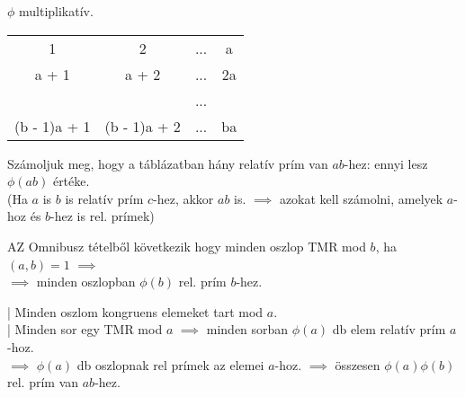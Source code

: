 \begin{frame}
  \begin{tcolorbox}[title={Tétel: $\phi$ multiplikativitása}]
  $\phi$ multiplikatív.
  \end{tcolorbox}

  \begin{tcolorbox}[title={Bizonyítás}]
    \smallskip

    \begin{tabular}{c c c c}
    1 & 2 & ... & a \\
    a + 1 & a + 2 & ... & 2a\\
     &  & ... &  \\
    (b - 1)a + 1 & (b - 1)a + 2 & ... & ba
    \end{tabular}
    \smallskip

    Számoljuk meg, hogy a táblázatban hány relatív prím van $ab$-hez: ennyi lesz ${\phi}(ab)$ értéke.\\
    (Ha $a$ is $b$ is relatív prím $c$-hez, akkor $ab$ is. $\implies$ azokat kell számolni, amelyek $a$-hoz és $b$-hez is rel. prímek)\\
    \smallskip

    AZ Omnibusz tételből következik hogy minden oszlop TMR mod $b$, ha $(a, b) = 1$ $\implies$\\
    $\implies$ minden oszlopban ${\phi}(b)$ rel. prím $b$-hez.\\
    \smallskip

    | Minden oszlom kongruens elemeket tart mod $a$.\\
    | Minden sor egy TMR mod $a$ $\implies$ minden sorban ${\phi}(a)$ db elem relatív prím $a$-hoz.\\
    $\implies$ ${\phi}(a)$ db oszlopnak rel prímek az elemei $a$-hoz. $\implies$ összesen ${\phi}(a){\phi}(b)$ rel. prím van $ab$-hez.
  \end{tcolorbox}
\end{frame}


